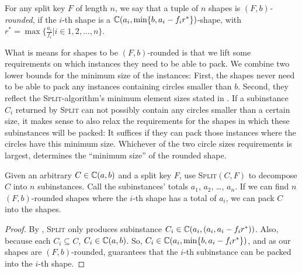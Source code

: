 \documentclass[%
    a4paper,              %
    style=screen,          %
    bibliography=totoc,   %
    nexus,                %
    lnum,                 %
    extramargin,          %
]{tubsbook}
\begin{document}
\begin{definition}\label{def:tangled}
    For any split key $F$ of length $n$, we say that a tuple of $n$ shapes is \emph{$(F,b)$-rounded}, if the $i$-th shape is a $\mathbb{C}(a_i, \min\{b,a_i - f_i r^*\})$-shape, with $r^* = \max\{\frac{a_i}{f_i}|i \in 1,2,\dots,n\}$.
\end{definition}

What is means for shapes to be $(F,b)$-rounded is that we lift some requirements on which instances they need to be able to pack. We combine two lower bounds for the minimum size of the instances: First, the shapes never need to be able to pack any instances containing circles smaller than $b$. Second, they reflect the \textsc{Split}-algorithm's minimum element sizes stated in . If a subinstance $C_i$ returned by \textsc{Split} can not possibly contain any circles smaller than a certain size, it makes sense to also relax the requirements for the shapes in which these subinstances will be packed: It suffices if they can pack those instances where the circles have this minimum size. Whichever of the two circle sizes requirements is largest, determines the “minimum size” of the rounded shape.



\begin{lemma}\label{th:split-tangle}
    Given an arbitrary $C \in \mathbb{C}(a,b)$ and a split key $F$, use \textsc{Split}$(C,F)$ to decompose $C$ into $n$ subinstances. Call the subinstances' totals $a_1$, $a_2$, \dots, $a_n$. If we can find $n$ $(F,b)$-rounded shapes where the $i$-th shape has a total of $a_i$, we can pack $C$ into the shapes.
\end{lemma}

\begin{proof}
    By , \textsc{Split} only produces subinstance $C_i \in \mathbb{C}(a_i, (a_i, a_i-f_i r^*))$. Also, because each $C_i \subseteq C$, $C_i \in \mathbb{C}(a,b)$. So, $C_i \in \mathbb{C}(a_i, \min\{b,a_i - f_i r^*\})$, and as our shapes are $(F,b)$-rounded,  guarantees that the $i$-th subinstance can be packed into the $i$-th shape.
\end{proof}
\end{document}
